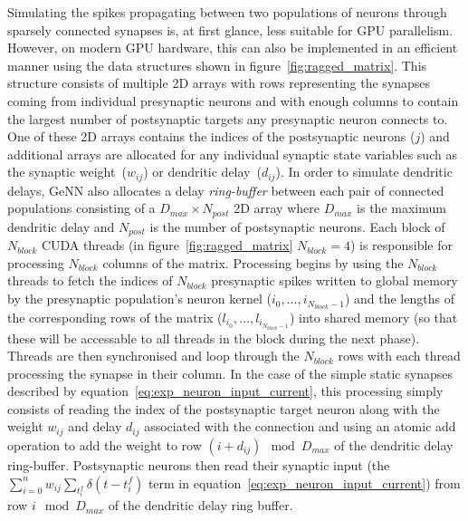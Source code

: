 \documentclass[utf8]{frontiersSCNS} %
\begin{document}
Simulating the spikes propagating between two populations of neurons through sparsely connected synapses is, at first glance, less suitable for GPU parallelism.
However, on modern GPU hardware, this can also be implemented in an efficient manner using the data structures shown in figure~\ref{fig:ragged_matrix}.
This structure consists of multiple 2D arrays with rows representing the synapses coming from individual presynaptic neurons and with enough columns to contain the largest number of postsynaptic targets any presynaptic neuron connects to.
One of these 2D arrays contains the indices of the postsynaptic neurons ($j$) and additional arrays are allocated for any individual synaptic state variables such as the synaptic weight~($w_{ij}$) or dendritic delay~($d_{ij}$).
In order to simulate dendritic delays, GeNN also allocates a delay \textit{ring-buffer} between each pair of connected populations consisting of a $D_{max} \times N_{post}$ 2D array where $D_{max}$ is the maximum dendritic delay and $N_{post}$ is the number of postsynaptic neurons.
Each block of $N_{block}$ CUDA threads (in figure~\ref{fig:ragged_matrix} $N_{block}=4$) is responsible for processing $N_{block}$ columns of the matrix.
Processing begins by using the $N_{block}$ threads to fetch the indices of $N_{block}$ presynaptic spikes written to global memory by the presynaptic population's neuron kernel ($i_{0},\ldots,i_{N_{block} - 1}$) and the lengths of the corresponding rows of the matrix ($l_{i_{0}},\ldots,l_{i_{N_{block} - 1}}$) into shared memory (so that these will be accessable to all threads in the block during the next phase).
Threads are then synchronised and loop through the $N_{block}$ rows with each thread processing the synapse in their column.
In the case of the simple static synapses described by equation~\ref{eq:exp_neuron_input_current}, this processing simply consists of reading the index of the postsynaptic target neuron along with the weight $w_{ij}$ and delay $d_{ij}$ associated with the connection and using an atomic add operation to add the weight to row $(i + d_{ij}) \mod D_{max}$ of the dendritic delay ring-buffer.
Postsynaptic neurons then read their synaptic input (the $\sum_{i=0}^{n} w_{ij} \sum_{t_{i}^{f}} \delta(t - t_{i}^{f})$ term in equation~\ref{eq:exp_neuron_input_current})  from row $i \mod D_{max}$ of the dendritic delay ring buffer.
\end{document}
